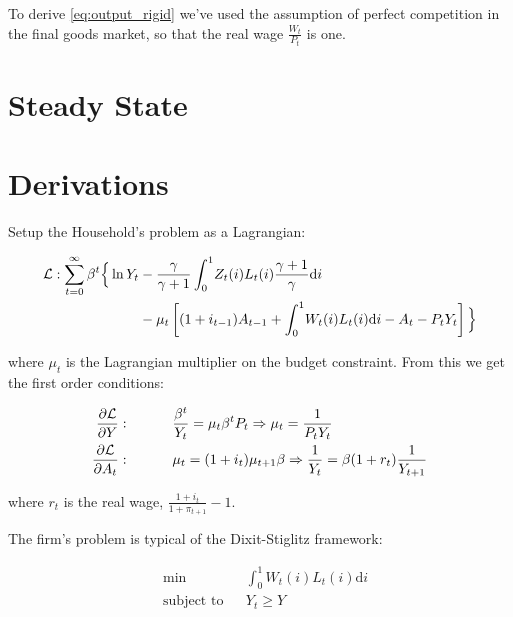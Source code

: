 \documentclass[12pt,a4paper]{scrartcl}            %
\begin{document}
To derive \ref{eq:output_rigid} we've used the assumption of perfect competition in the final goods market, so that the real wage $\frac{W_t}{P_t}$ is one.


\section{Steady State}
\label{sec:steady_state}

\newpage



\newpage
\appendix

\section{Derivations}

Setup the Household's problem as a Lagrangian:

\begin{equation}
    \label{eqa:houehold}
    \begin{split}
        \mathcal{L} : \sum_{t=0}^{\infty} \beta^t \Big\{ \ln Y_t & - \frac{\gamma}{\gamma + 1} \int_{0}^{1} \! Z_t(i)L_t(i) \frac{\gamma + 1}{\gamma} \mathrm{d}i \\
                                                           & - \mu_t \left[ (1 + i_{t-1})A_{t-1} + \int_{0}^{1} \! W_t(i)L_t(i) \mathrm{d}i  - A_t - P_tY_t\right] \Big\}
    \end{split}
\end{equation}

where $\mu_t$ is the Lagrangian multiplier on the budget constraint.
From this we get the first order conditions:

\begin{equation}
\begin{aligned}
    \label{eqa:focs}
    \frac{\partial \Lagr}{\partial Y} & :   \ \ \ \ \ \ \ \ \  \frac{\beta^t}{Y_t} = \mu_t \beta^t P_t \Rightarrow \mu_t = \frac{1}{P_t Y_t} \\
    \frac{\partial \Lagr}{\partial A_t} & : \ \ \ \ \ \ \ \ \  \mu_t = (1 + i_t) \mu_{t + 1} \beta \Rightarrow \frac{1}{Y_t} = \beta (1 + r_t) \frac{1}{Y_{t+1}}
\end{aligned}
\end{equation}

where $r_t$ is the real wage, $\frac{1 + i_t}{1 + \pi_{t+1}} - 1$.

The firm's problem is typical of the Dixit-Stiglitz framework:

\begin{equation}
    \label{eqa:firms_problem}
    \begin{aligned}
        & \min
        & & \int_{0}^{1} \! W_t(i)L_t(i) \mathrm{d}i \\
        & \text{subject to}
        & & Y_t \geq Y
    \end{aligned}
\end{equation}
\end{document}
